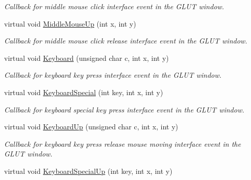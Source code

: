 \begin{DoxyCompactItemize}
\begin{DoxyCompactList}\small\item\em Callback for middle mouse click interface event in the G\+L\+UT window. \end{DoxyCompactList}\item 
virtual void \hyperlink{classimage__tools_1_1BaseGfxApp_aacd2e87274e8731f34eaf2e0816001e8}{Middle\+Mouse\+Up} (int x, int y)\hypertarget{classimage__tools_1_1BaseGfxApp_aacd2e87274e8731f34eaf2e0816001e8}{}\label{classimage__tools_1_1BaseGfxApp_aacd2e87274e8731f34eaf2e0816001e8}

\begin{DoxyCompactList}\small\item\em Callback for middle mouse click release interface event in the G\+L\+UT window. \end{DoxyCompactList}\item 
virtual void \hyperlink{classimage__tools_1_1BaseGfxApp_afe086488f233d55e1dfd4bf4883b7cb8}{Keyboard} (unsigned char c, int x, int y)\hypertarget{classimage__tools_1_1BaseGfxApp_afe086488f233d55e1dfd4bf4883b7cb8}{}\label{classimage__tools_1_1BaseGfxApp_afe086488f233d55e1dfd4bf4883b7cb8}

\begin{DoxyCompactList}\small\item\em Callback for keyboard key press interface event in the G\+L\+UT window. \end{DoxyCompactList}\item 
virtual void \hyperlink{classimage__tools_1_1BaseGfxApp_aba20c48d82b9da16e9e5d716e404a8df}{Keyboard\+Special} (int key, int x, int y)\hypertarget{classimage__tools_1_1BaseGfxApp_aba20c48d82b9da16e9e5d716e404a8df}{}\label{classimage__tools_1_1BaseGfxApp_aba20c48d82b9da16e9e5d716e404a8df}

\begin{DoxyCompactList}\small\item\em Callback for keyboard special key press interface event in the G\+L\+UT window. \end{DoxyCompactList}\item 
virtual void \hyperlink{classimage__tools_1_1BaseGfxApp_a156d7877e6ed3c3d7707618ebad15e9b}{Keyboard\+Up} (unsigned char c, int x, int y)\hypertarget{classimage__tools_1_1BaseGfxApp_a156d7877e6ed3c3d7707618ebad15e9b}{}\label{classimage__tools_1_1BaseGfxApp_a156d7877e6ed3c3d7707618ebad15e9b}

\begin{DoxyCompactList}\small\item\em Callback for keyboard key press release mouse moving interface event in the G\+L\+UT window. \end{DoxyCompactList}\item 
virtual void \hyperlink{classimage__tools_1_1BaseGfxApp_a548437fcd4b0c87fa5e5c46d68f38683}{Keyboard\+Special\+Up} (int key, int x, int y)\hypertarget{classimage__tools_1_1BaseGfxApp_a548437fcd4b0c87fa5e5c46d68f38683}{}\label{classimage__tools_1_1BaseGfxApp_a548437fcd4b0c87fa5e5c46d68f38683}


\end{DoxyCompactItemize}
